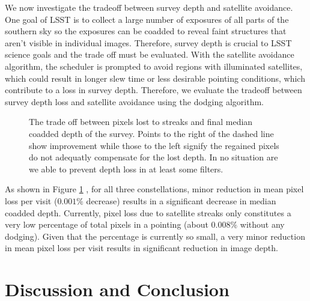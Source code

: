 \documentclass[linenumbers]{aastex631}
\begin{document}
We now investigate the tradeoff between survey depth and satellite avoidance. One goal of LSST is to collect a large number of exposures of all parts of the southern sky so the
exposures can be coadded to reveal faint structures that aren’t visible in individual images.
Therefore, survey depth is crucial to LSST science goals and the trade off must be evaluated.
With the satellite avoidance algorithm, the scheduler is prompted to avoid regions with
illuminated satellites, which could result in longer slew time or less desirable pointing
conditions, which contribute to a loss in survey depth. Therefore, we evaluate the tradeoff
between survey depth loss and satellite avoidance using the dodging algorithm.\\

\begin{figure}[ht!]
\caption{The trade off between pixels lost to streaks and final median coadded depth of the survey. Points to the right of the dashed line show improvement while those to the left signify the regained pixels do not adequatly compensate for the lost depth. In no situation are we able to prevent depth loss in at least some filters. \label{fig-trade-off}}
\end{figure}

As shown in Figure \ref{fig-trade-off} , for all three constellations, minor reduction in mean pixel loss per visit
($0.001\%$ decrease) results in a significant decrease in median coadded depth. Currently, pixel
loss due to satellite streaks only constitutes a very low percentage of total pixels in a pointing
(about $0.008\%$ without any dodging). Given that the percentage is currently so small, a very
minor reduction in mean pixel loss per visit results in significant reduction in image depth.

\section{Discussion and Conclusion}
\end{document}
